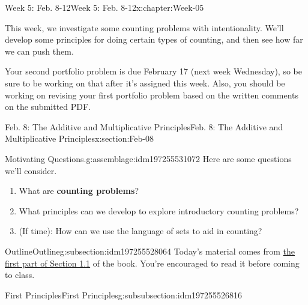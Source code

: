\documentclass[oneside,10pt,]{book}
\newcommand{\terminology}[1]{\textbf{#1}}
\numberwithin{equation}{section}
\begin{document}
\begin{chapterptx}{Week 5: Feb. 8-12}{}{Week 5: Feb. 8-12}{}{}{x:chapter:Week-05}
\begin{introduction}{}%
This week, we investigate some counting problems with intentionality. We'll develop some principles for doing certain types of counting, and then see how far we can push them.%
\par
Your second portfolio problem is due February 17 (next week Wednesday), so be sure to be working on that after it's assigned this week. Also, you should be working on revising your first portfolio problem based on the written comments on the submitted PDF.%
\end{introduction}%
%
%
\typeout{************************************************}
\typeout{************************************************}
%
\begin{sectionptx}{Feb. 8: The Additive and Multiplicative Principles}{}{Feb. 8: The Additive and Multiplicative Principles}{}{}{x:section:Feb-08}
\begin{introduction}{}%
\begin{assemblage}{Motivating Questions.}{g:assemblage:idm197255531072}%
Here are some questions we'll consider. %
\begin{enumerate}
\item{}What are \terminology{counting problems}?%
\item{}What principles can we develop to explore introductory counting problems?%
\item{}(If time): How can we use the language of sets to aid in counting?%
\end{enumerate}
%
\end{assemblage}
\end{introduction}%
%
%
\typeout{************************************************}
\typeout{************************************************}
%
\begin{subsectionptx}{Outline}{}{Outline}{}{}{g:subsection:idm197255528064}
Today's material comes from \href{http://discrete.openmathbooks.org/dmoi3/sec_counting-addmult.html}{the first part of Section 1.1} of the book. You're encouraged to read it before coming to class.%
%
%
\typeout{************************************************}
\typeout{************************************************}
%
\begin{subsubsectionptx}{First Principles}{}{First Principles}{}{}{g:subsubsection:idm197255526816}

\end{subsubsectionptx}
\end{subsectionptx}
\end{sectionptx}
\end{chapterptx}
\end{document}
